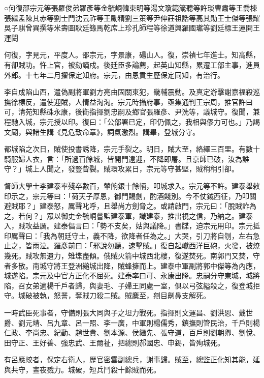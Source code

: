 
\begin{pinyinscope}
○何復邵宗元等張羅俊弟羅彥等金毓峒韓東明等湯文瓊範箴聽等許琰曹肅等王喬棟張繼孟陳其赤等劉士鬥沈云祚等王勵精劉三策等尹伸莊祖誥等高其勛王士傑等張耀吳子騏曾異撰等米壽圖耿廷籙馬乾席上珍孔師程等徐道興羅國瓛等劉廷標王運開王運閎

何復，字見元，平度人。邵宗元，字景康，碭山人。復，崇禎七年進士。知高縣，有卻賊功。忤上官，被劾謫戍。後廷臣多論薦，起英山知縣，累遷工部主事，進員外郎。十七年二月擢保定知府。宗元，由恩貢生歷保定同知，有治行。

李自成陷山西，遣偽副將軍劉方亮由固關東犯，畿輔震動。及真定游擊謝嘉福殺巡撫徐標反，遣使迎賊，人情益洶洶。宗元時攝府事，亟集通判王宗周，推官許曰可，清苑知縣硃永康，後衛指揮劉忠嗣及鄉官張羅彥、尹洗等，議城守。復聞，兼程馳入城，宗元授以印。復曰：「公部署已定，印仍佩之，我相與僇力可也。」乃謁文廟，與諸生講《見危致命章》，詞氣激烈。講畢，登城分守。

都城陷之次日，賊使投書誘降，宗元手裂之。明日，賊大至，絡繹三百里。有數十騎服婦人衣，言：「所過百餘城，皆開門遠迎，不降即屠。且京師已破，汝為誰守？」城上人聞之，發豎眥裂。賊環攻累日，宗元等守甚堅，賊稍稍引卻。

督師大學士李建泰率殘卒數百，輦餉銀十餘輛，叩城求入。宗元等不許。建泰舉敕印示之，宗元等曰：「荷天子厚恩，御門賜劍，酌酒餞別。今不仗鉞西征，乃叩關避賊耶？」建泰怒，厲聲叱呼，且舉尚方劍脅之。或請啟門，宗元曰：「脫賊詐為之，若何？」眾以御史金毓峒嘗監建泰軍，識建泰，推出視之信，乃納之。建泰入，賊攻益厲。建泰倡言曰：「勢不支矣，姑與議降。」書牒，迫宗元用印。宗元抵印厲聲曰：「我為朝廷守土，義不降，欲降者任為之。」大哭，引刀將自刎，左右急止之，皆雨泣。羅彥前曰：「邪說勿聽，速擊賊。」復自起巘西洋巨砲，火發，被燎幾死。賊攻無遺力，雉堞盡傾。俄賊火箭中城西北樓，復遂焚死。南郭門又焚，守者多散。南城守將王登洲縋城出降，賊蜂擁而上。建泰中軍副將郭中傑等為內應，城遂陷。宗元及中官方正化不屈死。建泰率曰可、永康出降。忠嗣分守東城，城將陷，召女弟適楊千戶者歸，與妻毛、子婦王同處一室，俱以弓弦縊殺之，復登城拒守。城破被執，怒詈，奪賊刀殺二賊。賊麇至，剜目劓鼻支解死。

一時武臣死事者，守備則張大同與子之坦力戰死。指揮則文運昌、劉洪恩、戴世爵、劉元靖、呂九章、呂一照、李一廣，中軍則楊儒秀，鎮撫則管民治，千戶則楊仁政、李尚忠、紀動、趙世貴、劉本源、侯繼先、張守道，百戶則劉朝卿、劉悅、田守正、王好善、強忠武、王爾祉，把總則郝國忠、申錫，皆殉城死。

有呂應蛟者，保定右衛人，歷官密雲副總兵，謝事歸。賊至，總監正化知其能，延與共守，晝夜戮力。城破，短兵鬥殺十餘賊而死。


\end{pinyinscope}
